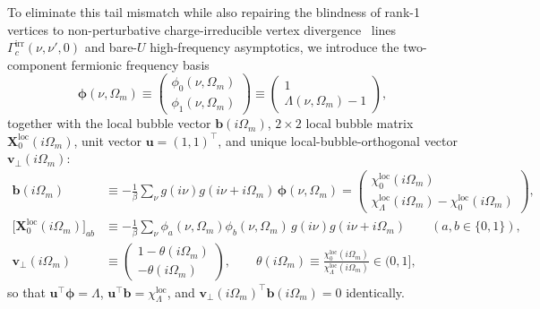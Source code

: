 \documentclass[11pt,a4paper]{article}
\numberwithin{equation}{section}
\theoremstyle{plain}
\theoremstyle{definition}
\begin{document}
To eliminate this tail mismatch while also repairing the blindness of rank-1 vertices
to non-perturbative charge-irreducible vertex divergence~\cite{Schaefer2013,Gunnarsson2017,Chalupa2021} lines
$\Gamma_c^{\mathrm{irr}}(\nu,\nu',0)$ and bare-$U$ high-frequency asymptotics, we
introduce the two-component fermionic frequency basis
\begin{equation}
    \boldsymbol{\phi}(\nu, \Omega_m)
    \equiv \begin{pmatrix} \phi_0(\nu,\Omega_m) \\ \phi_1(\nu,\Omega_m) \end{pmatrix}
    \equiv \begin{pmatrix} 1 \\ \Lambda(\nu,\Omega_m) - 1 \end{pmatrix},
    \label{eq:phi_basis}
\end{equation}
together with the local bubble vector $\mathbf{b}(i\Omega_m)$, $2\times 2$ local bubble
matrix $\mathbf{X}_0^{\mathrm{loc}}(i\Omega_m)$, unit vector $\mathbf{u} = (1,1)^\top$,
and unique local-bubble-orthogonal vector $\mathbf{v}_\perp(i\Omega_m)$:
\begin{align}
    \mathbf{b}(i\Omega_m)
    &\equiv -\frac{1}{\beta} \sum_{\nu} g(i\nu)g(i\nu+i\Omega_m)\, \boldsymbol{\phi}(\nu,\Omega_m)
     = \begin{pmatrix} \chi_0^{\mathrm{loc}}(i\Omega_m) \\
                       \chi_\Lambda^{\mathrm{loc}}(i\Omega_m) - \chi_0^{\mathrm{loc}}(i\Omega_m) \end{pmatrix},
    \label{eq:b_vec} \\
    \bigl[\mathbf{X}_0^{\mathrm{loc}}(i\Omega_m)\bigr]_{ab}
    &\equiv -\frac{1}{\beta} \sum_{\nu} \phi_a(\nu,\Omega_m)\phi_b(\nu,\Omega_m)\,
            g(i\nu) g(i\nu+i\Omega_m) \qquad (a,b \in \{0,1\}),
    \label{eq:chi0_mat} \\
    \mathbf{v}_\perp(i\Omega_m)
    &\equiv \begin{pmatrix} 1 - \theta(i\Omega_m) \\ -\theta(i\Omega_m) \end{pmatrix},
    \qquad
    \theta(i\Omega_m) \equiv \frac{\chi_0^{\mathrm{loc}}(i\Omega_m)}{\chi_\Lambda^{\mathrm{loc}}(i\Omega_m)} \in (0, 1],
    \label{eq:v_perp}
\end{align}
so that $\mathbf{u}^\top\boldsymbol{\phi} = \Lambda$,
$\mathbf{u}^\top\mathbf{b} = \chi_\Lambda^{\mathrm{loc}}$, and
$\mathbf{v}_\perp(i\Omega_m)^\top \mathbf{b}(i\Omega_m) = 0$ identically.
\end{document}
